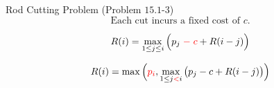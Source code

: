 \begin{frame}{}
  \begin{exampleblock}{Rod Cutting Problem (Problem $15.1$-$3$)}
    \[
      \text{Each cut incurs a fixed cost of } c.
    \]
  \end{exampleblock}

  \pause
  \[
    R(i) = \max_{1 \le j \le i} \Big(p_j \;\textcolor{red}{ -\; c} + R(i-j)\Big)
  \]

  \pause
  \[
    R(i) = \max \Big( \textcolor{red}{p_i}, \max_{1 \le j \textcolor{red}{<} i} \big(p_j - c + R(i-j)\big) \Big)
  \]
\end{frame}

% 
